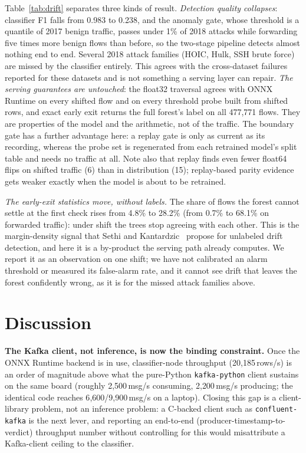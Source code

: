 \documentclass[runningheads]{llncs}
\begin{document}
Table~\ref{tab:drift} separates three kinds of result. \emph{Detection quality collapses}: classifier F1 falls from 0.983 to 0.238, and the anomaly gate, whose threshold is a quantile of 2017 benign traffic, passes under 1\% of 2018 attacks while forwarding five times more benign flows than before, so the two-stage pipeline detects almost nothing end to end. Several 2018 attack families (HOIC, Hulk, SSH brute force) are missed by the classifier entirely. This agrees with the cross-dataset failures reported for these datasets and is not something a serving layer can repair. \emph{The serving guarantees are untouched}: the float32 traversal agrees with ONNX Runtime on every shifted flow and on every threshold probe built from shifted rows, and exact early exit returns the full forest's label on all 477{,}771 flows. They are properties of the model and the arithmetic, not of the traffic. The boundary gate has a further advantage here: a replay gate is only as current as its recording, whereas the probe set is regenerated from each retrained model's split table and needs no traffic at all. Note also that replay finds even fewer float64 flips on shifted traffic (6) than in distribution (15); replay-based parity evidence gets weaker exactly when the model is about to be retrained.

\emph{The early-exit statistics move, without labels.} The share of flows the forest cannot settle at the first check rises from 4.8\% to 28.2\% (from 0.7\% to 68.1\% on forwarded traffic): under shift the trees stop agreeing with each other. This is the margin-density signal that Sethi and Kantardzic~\cite{sethi2017md3} propose for unlabeled drift detection, and here it is a by-product the serving path already computes. We report it as an observation on one shift; we have not calibrated an alarm threshold or measured its false-alarm rate, and it cannot see drift that leaves the forest confidently wrong, as it is for the missed attack families above.

\section{Discussion}
\label{sec:discussion}

\textbf{The Kafka client, not inference, is now the binding constraint.} Once the ONNX Runtime backend is in use, classifier-node throughput (20{,}185\,rows/s) is an order of magnitude above what the pure-Python \texttt{kafka-python} client sustains on the same board (roughly 2{,}500\,msg/s consuming, 2{,}200\,msg/s producing; the identical code reaches 6{,}600/9{,}900\,msg/s on a laptop). Closing this gap is a client-library problem, not an inference problem: a C-backed client such as \texttt{confluent-kafka} is the next lever, and reporting an end-to-end (producer-timestamp-to-verdict) throughput number without controlling for this would misattribute a Kafka-client ceiling to the classifier.
\end{document}
